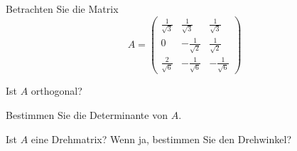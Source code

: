 Betrachten Sie die Matrix
\[
A=
\begin{pmatrix}
\frac1{\sqrt{3}}&\frac1{\sqrt{3}}&\frac1{\sqrt{3}}\\
0&-\frac1{\sqrt{2}}&\frac1{\sqrt{2}}\\
\frac2{\sqrt{6}}&-\frac1{\sqrt{6}}&-\frac1{\sqrt{6}}
\end{pmatrix}
\]
\begin{teilaufgaben}
\item
Ist $A$ orthogonal?
\item
Bestimmen Sie die Determinante von $A$.
\item
Ist $A$ eine Drehmatrix? Wenn ja, bestimmen Sie den Drehwinkel?
\end{teilaufgaben}



